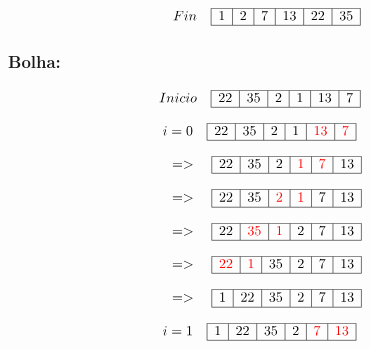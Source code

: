 \documentclass{article}
\begin{document}
\[
    \quad Fin \quad
\begin{array}{|c|c|c|c|c|c|}
\hline
1 & 2 & 7 &  13 &  22 & 35 \\  
\hline
\end{array}
\]

\subsubsection{Bolha:}


\[
Inicio \quad
\begin{array}{|c|c|c|c|c|c|}
\hline
22 & 35 & 2 & 1 & 13 & 7 \\ 
\hline
\end{array}
\]

\[
i = 0 \quad
\begin{array}{|c|c|c|c|c|c|}
\hline
22 & 35 & 2 & 1 & \textcolor{red}{13} & \textcolor{red}{7} \\ 
\hline
\end{array}
\]

\[
    \quad => \quad
\begin{array}{|c|c|c|c|c|c|}
\hline
22 & 35 & 2 & \textcolor{red}{1} & \textcolor{red}{7} & 13 \\ 
\hline
\end{array}
\]


\[
    \quad => \quad
\begin{array}{|c|c|c|c|c|c|}
\hline
22 & 35 & \textcolor{red}{2} & \textcolor{red}{1} & 7 & 13 \\ 
\hline
\end{array}
\]

\[
    \quad => \quad
\begin{array}{|c|c|c|c|c|c|}
\hline
22 & \textcolor{red}{35} & \textcolor{red}{1} & 2 & 7 & 13 \\ 
\hline
\end{array}
\]

\[
    \quad => \quad
\begin{array}{|c|c|c|c|c|c|}
\hline
\textcolor{red}{22} & \textcolor{red}{1} & 35 & 2 & 7 & 13 \\ 
\hline
\end{array}
\]

\[
    \quad => \quad
\begin{array}{|c|c|c|c|c|c|}
\hline
1 & 22 & 35 & 2 & 7 & 13 \\ 
\hline
\end{array}
\]

\[
i = 1 \quad
\begin{array}{|c|c|c|c|c|c|}
\hline
1 & 22 & 35 & 2 & \textcolor{red}{7} & \textcolor{red}{13} \\ 
\hline
\end{array}
\]
\end{document}
